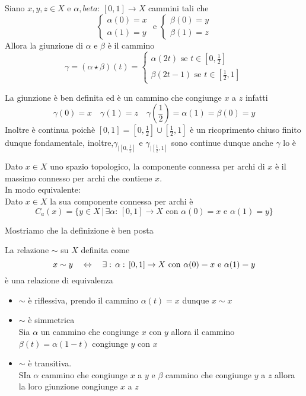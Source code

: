 \newpage
\begin{defn}\bianco
Siano $x,y,z\in X $ e  $\alpha,beta:\, [0,1]\to X $ cammini tali che 
$$ \begin{cases} \alpha(0)=x\\
\alpha(1)=y 
\end{cases}\text{ e } \begin{cases} \beta(0)=y\\
\beta(1)=z
\end{cases}$$
Allora la giunzione di $\alpha$ e $\beta$ \`e il cammino 
$$ \gamma= ( \alpha \star \beta )(t) = \begin{cases} 
\alpha(2t) \text{ se } t \in \left[ 0, \frac{1}{2}\right]\\
\beta(2t-1) \text{ se } t \in \left[\frac{1}{2},1\right]
\end{cases}$$
\end{defn}
\begin{oss}La giunzione \`e ben definita ed \`e un cammino che congiunge $x$ a $z$ infatti
$$ \gamma(0)=x \quad \gamma(1)=z \quad \gamma\left(\frac{1}{2}\right) = \alpha(1) =\beta(0)=y$$
Inoltre \`e continua poich\`e $[0,1]=\left[ 0, \frac{1}{2}\right] \cup \left[ \frac{1}{2}, 1 \right]$ \`e un ricoprimento chiuso finito dunque fondamentale, inoltre,$\gamma_{\vert \left[0, \frac{1}{2}\right]} $ e $\gamma_{\vert \left[ \frac{1}{2}, 1 \right]}$ sono continue dunque anche $\gamma$ lo \`e
\end{oss}
\begin{defn}\bianco
Dato $x\in X$ uno spazio topologico, la componente connessa per archi di $x$ \`e il massimo connesso per archi che contiene $x$.\\
In modo equivalente:\\
Dato $x\in X$ la sua componente connessa per archi \`e
$$ C_a(x) =\{ y \in X \, \vert \, \exists \alpha:\, [0,1] \to X \text{ con } \alpha(0)=x \text{ e } \alpha(1)=y \}$$
\end{defn}
Mostriamo che la definizione \`e ben posta
\begin{prop}
La relazione $\sim $ su $X$ definita come 
$$ x\sim y \quad \Leftrightarrow \quad \exists:\, \alpha:\, [0,1]\to X \text{ con } \alpha(0)=x \text{ e } \alpha(1)=y$$
\`e una relazione di equivalenza
\proof
\bbianco
\begin{itemize}
\item $\sim$ \`e riflessiva, prendo il cammino $\alpha(t)=x$ dunque $x\sim x$
\item $\sim$ \`e simmetrica\\
Sia $\alpha$ un cammino che congiunge $x$ con $y$ allora il cammino $\beta(t)=\alpha(1-t)$ congiunge $y$ con $x$
\item $\sim$ \`e transitiva.\\
SIa $\alpha$ cammino che congiunge $x$ a $y$ e $\beta$ cammino che congiunge $y$ a $z$ allora la loro giunzione congiunge $x$ a $z$
\end{itemize}
\endproof
\end{prop}
